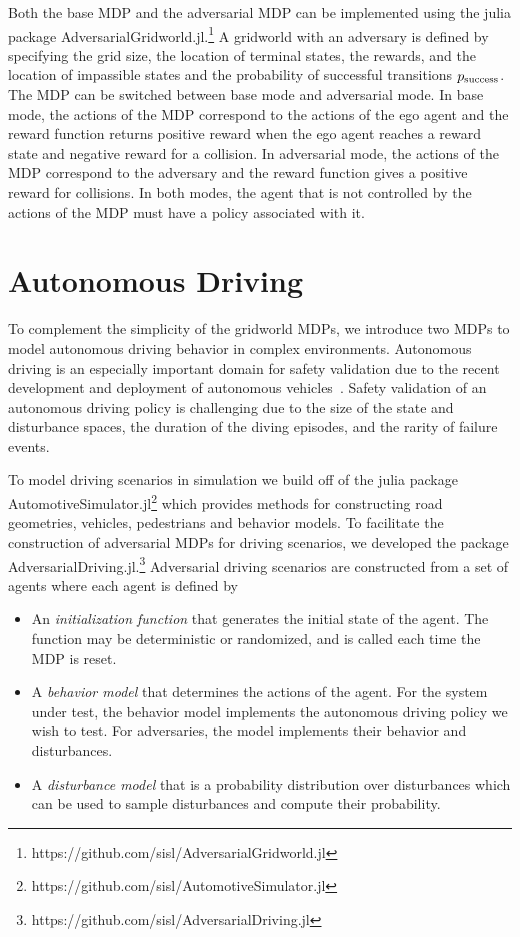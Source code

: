 Both the base MDP and the adversarial MDP can be implemented using the julia package AdversarialGridworld.jl.\footnote{https://github.com/sisl/AdversarialGridworld.jl} A gridworld with an adversary is defined by specifying the grid size, the location of terminal states, the rewards, and the location of impassible states and the probability of successful transitions $p_{\rm success}$. The MDP can be switched between base mode and adversarial mode. In base mode, the actions of the MDP correspond to the actions of the ego agent and the reward function returns positive reward when the ego agent reaches a reward state and negative reward for a collision. In adversarial mode, the actions of the MDP correspond to the adversary and the reward function gives a positive reward for collisions. In both modes, the agent that is not controlled by the actions of the MDP must have a policy associated with it.

\section{Autonomous Driving}
To complement the simplicity of the gridworld MDPs, we introduce two MDPs to model autonomous driving behavior in complex environments. Autonomous driving is an especially important domain for safety validation due to the recent development and deployment of autonomous vehicles~\cite{koopman2016challenges}. Safety validation of an autonomous driving policy is challenging due to the size of the state and disturbance spaces, the duration of the diving episodes, and the rarity of failure events.

To model driving scenarios in simulation we build off of the julia package AutomotiveSimulator.jl\footnote{https://github.com/sisl/AutomotiveSimulator.jl} which provides methods for constructing road geometries, vehicles, pedestrians and behavior models. To facilitate the construction of adversarial MDPs for driving scenarios, we developed the package AdversarialDriving.jl.\footnote{https://github.com/sisl/AdversarialDriving.jl} Adversarial driving scenarios are constructed from a set of agents where each agent is defined by
\begin{itemize}
    \item An \emph{initialization function} that generates the initial state of the agent. The function may be deterministic or randomized, and is called each time the MDP is reset. 
    \item A \emph{behavior model} that determines the actions of the agent. For the system under test, the behavior model implements the autonomous driving policy we wish to test. For adversaries, the model implements their behavior and disturbances.
    \item A \emph{disturbance model} that is a probability distribution over disturbances which can be used to sample disturbances and compute their probability. 
\end{itemize}

